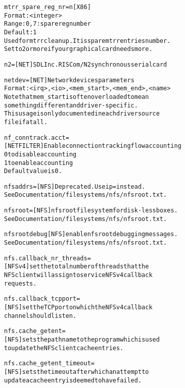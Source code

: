 \documentclass[a4paper,8pt,english]{sphinxmanual}
\begin{document}
\begin{alltt}
        mtrr\_spare\_reg\_nr=n {[}X86{]}
                        Format: \textless{}integer\textgreater{}
                        Range: 0,7 : spare reg number
                        Default : 1
                        Used for mtrr cleanup. It is spare mtrr entries number.
                        Set to 2 or more if your graphical card needs more.

        n2=             {[}NET{]} SDL Inc. RISCom/N2 synchronous serial card

        netdev=         {[}NET{]} Network devices parameters
                        Format: \textless{}irq\textgreater{},\textless{}io\textgreater{},\textless{}mem\_start\textgreater{},\textless{}mem\_end\textgreater{},\textless{}name\textgreater{}
                        Note that mem\_start is often overloaded to mean
                        something different and driver-specific.
                        This usage is only documented in each driver source
                        file if at all.

        nf\_conntrack.acct=
                        {[}NETFILTER{]} Enable connection tracking flow accounting
                        0 to disable accounting
                        1 to enable accounting
                        Default value is 0.

        nfsaddrs=       {[}NFS{]} Deprecated.  Use ip= instead.
                        See Documentation/filesystems/nfs/nfsroot.txt.

        nfsroot=        {[}NFS{]} nfs root filesystem for disk-less boxes.
                        See Documentation/filesystems/nfs/nfsroot.txt.

        nfsrootdebug    {[}NFS{]} enable nfsroot debugging messages.
                        See Documentation/filesystems/nfs/nfsroot.txt.

        nfs.callback\_nr\_threads=
                        {[}NFSv4{]} set the total number of threads that the
                        NFS client will assign to service NFSv4 callback
                        requests.

        nfs.callback\_tcpport=
                        {[}NFS{]} set the TCP port on which the NFSv4 callback
                        channel should listen.

        nfs.cache\_getent=
                        {[}NFS{]} sets the pathname to the program which is used
                        to update the NFS client cache entries.

        nfs.cache\_getent\_timeout=
                        {[}NFS{]} sets the timeout after which an attempt to
                        update a cache entry is deemed to have failed.


\end{alltt}
\end{document}
